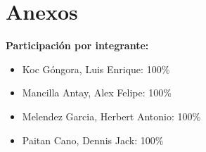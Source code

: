 \documentclass[12pt]{article}
\begin{document}
\newpage
\section*{Anexos}
	\textbf{Participación por integrante:}
	\begin{itemize}
		\item Koc Góngora, Luis Enrique: 100\%
		\item Mancilla Antay, Alex Felipe: 100\%
		\item Melendez Garcia, Herbert Antonio: 100\%
		\item Paitan Cano, Dennis Jack: 100\%
	\end{itemize}
	
\end{document}
